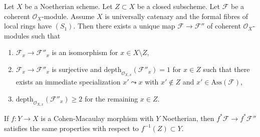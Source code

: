\begin{lemma}
\label{lemma-make-S2-along-Z}
Let $X$ be a Noetherian scheme. Let $Z \subset X$ be a closed subscheme.
Let $\mathcal{F}$ be a coherent $\mathcal{O}_X$-module. Assume
$X$ is universally catenary and the formal fibres of local rings have $(S_1)$.
Then there exists a unique map $\mathcal{F} \to \mathcal{F}''$
of coherent $\mathcal{O}_X$-modules such that
\begin{enumerate}
\item $\mathcal{F}_x \to \mathcal{F}''_x$
is an isomorphism for $x \in X \setminus Z$,
\item $\mathcal{F}_x \to \mathcal{F}''_x$ is surjective and
$\text{depth}_{\mathcal{O}_{X, x}}(\mathcal{F}''_x) = 1$
for $x \in Z$ such that there exists an immediate specialization
$x' \leadsto x$ with $x' \not \in Z$ and $x' \in \text{Ass}(\mathcal{F})$,
\item $\text{depth}_{\mathcal{O}_{X, x}}(\mathcal{F}''_x) \geq 2$
for the remaining $x \in Z$.
\end{enumerate}
If $f : Y \to X$ is a Cohen-Macaulay morphism with $Y$ Noetherian,
then $f^*\mathcal{F} \to f^*\mathcal{F}''$ satisfies the same properties
with respect to $f^{-1}(Z) \subset Y$.
\end{lemma}

